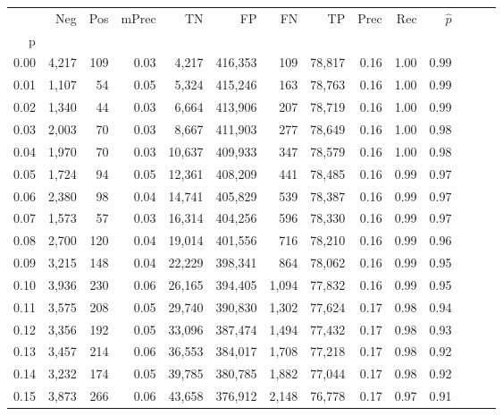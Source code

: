 \begin{tabular}{rrrrrrrrrrrrrr}
\toprule
{} &    Neg &    Pos & mPrec &       TN &       FP &      FN &      TP &  Prec &   Rec & $\hat{p}$ \\
p    &        &        &       &          &          &         &         &       &       &           \\
\midrule
0.00 &  4,217 &    109 &  0.03 &    4,217 &  416,353 &     109 &  78,817 &  0.16 &  1.00 &      0.99 \\
0.01 &  1,107 &     54 &  0.05 &    5,324 &  415,246 &     163 &  78,763 &  0.16 &  1.00 &      0.99 \\
0.02 &  1,340 &     44 &  0.03 &    6,664 &  413,906 &     207 &  78,719 &  0.16 &  1.00 &      0.99 \\
0.03 &  2,003 &     70 &  0.03 &    8,667 &  411,903 &     277 &  78,649 &  0.16 &  1.00 &      0.98 \\
0.04 &  1,970 &     70 &  0.03 &   10,637 &  409,933 &     347 &  78,579 &  0.16 &  1.00 &      0.98 \\
0.05 &  1,724 &     94 &  0.05 &   12,361 &  408,209 &     441 &  78,485 &  0.16 &  0.99 &      0.97 \\
0.06 &  2,380 &     98 &  0.04 &   14,741 &  405,829 &     539 &  78,387 &  0.16 &  0.99 &      0.97 \\
0.07 &  1,573 &     57 &  0.03 &   16,314 &  404,256 &     596 &  78,330 &  0.16 &  0.99 &      0.97 \\
0.08 &  2,700 &    120 &  0.04 &   19,014 &  401,556 &     716 &  78,210 &  0.16 &  0.99 &      0.96 \\
0.09 &  3,215 &    148 &  0.04 &   22,229 &  398,341 &     864 &  78,062 &  0.16 &  0.99 &      0.95 \\
0.10 &  3,936 &    230 &  0.06 &   26,165 &  394,405 &   1,094 &  77,832 &  0.16 &  0.99 &      0.95 \\
0.11 &  3,575 &    208 &  0.05 &   29,740 &  390,830 &   1,302 &  77,624 &  0.17 &  0.98 &      0.94 \\
0.12 &  3,356 &    192 &  0.05 &   33,096 &  387,474 &   1,494 &  77,432 &  0.17 &  0.98 &      0.93 \\
0.13 &  3,457 &    214 &  0.06 &   36,553 &  384,017 &   1,708 &  77,218 &  0.17 &  0.98 &      0.92 \\
0.14 &  3,232 &    174 &  0.05 &   39,785 &  380,785 &   1,882 &  77,044 &  0.17 &  0.98 &      0.92 \\
0.15 &  3,873 &    266 &  0.06 &   43,658 &  376,912 &   2,148 &  76,778 &  0.17 &  0.97 &      0.91 \\

\end{tabular}
